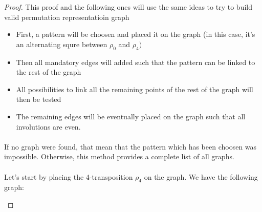 \begin{proof}
  This proof and the following ones will use the same ideas to try to build valid permutation representatioin graph
  \begin{itemize}
    \item First, a pattern will be choosen and placed it on the graph (in this case, it's an alternating squre between $\rho_0$ and $\rho_4)$
    \item Then all mandatory edges will added such that the pattern can be linked to the rest of the graph
    \item All possibilities to link all the remaining points of the rest of the graph will then be tested
    \item The remaining edges will be eventually placed on the graph such that all involutions are even.
  \end{itemize}

  \paragraph{}
  If no graph were found, that mean that the pattern which has been choosen was impossible. Otherwise, this method provides a complete list of all graphs.

  \paragraph{}
  Let's start by placing the 4-transposition $\rho_4$ on the graph. We have the following graph:

  \begin{figure}[H]
    \begin{center}
\end{center}
\end{figure}
\end{proof}

